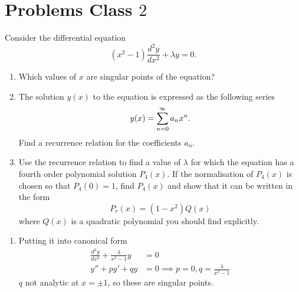 \documentclass[10pt, a4paper]{article}
\begin{document}
\newpage

\section{Problems Class \texorpdfstring{$2$}{}}

\begin{problem}[Resit $2022$]
    Consider the differential equation
    \[
    (x ^ 2 - 1)\frac{d ^ 2y}{dx ^ 2} + \lambda y = 0.
    \]
    \begin{enumerate}[label = (\alph*)]
        \item Which values of $x$ are singular points of the equation?

        \item The solution $y(x)$ to the equation is expressed as the following series
        \[
        y(x) = \infsum[n = 0]a_nx ^ n.
        \]
        Find a recurrence relation for the coefficients $a_n$.

        \item Use the recurrence relation to find a value of $\lambda$ for which the equation has a fourth order polynomial solution $P_4(x)$.
        If the normalisation of $P_4(x)$ is chosen so that $P_4(0) = 1$,
        find $P_4(x)$ and show that it can be written in the form
        \[
        P_r(x) = (1 - x ^ 2)Q(x)
        \]
        where $Q(x)$ is a quadratic polynomial you should find explicitly.
    \end{enumerate}

    \begin{solution}
        \begin{enumerate}[label = (\alph*)]
            \item 
            Putting it into canonical form
            \begin{align*}
                \frac{d ^ 2y}{dx ^ 2} + \frac{\lambda}{x ^ 2 - 1}y &= 0 \\
                y'' + py' + qy &= 0 \implies p = 0, q = \frac{\lambda}{x ^ 2 - 1}
            \end{align*}
            $q$ not analytic at $x = \pm 1$,
            so these are singular points.


\end{enumerate}
\end{solution}
\end{problem}
\end{document}
